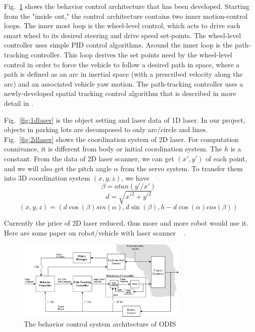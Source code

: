 \documentclass{cdcarta4}
\begin{document}
Fig.~\ref{odis1blk} shows the behavior control architecture that has been developed. 
Starting from the "inside out," the control architecture contains two inner motion-control loops. The inner most loop is the wheel-level control, which acts to drive each smart wheel to its desired steering and drive speed set-points. The wheel-level controller uses simple PID control algorithms. Around the inner loop is the path-tracking controller. This loop derives the set points need by the wheel-level control in order to force the vehicle to follow a desired path in space, where a path is defined as an arc in inertial space (with a prescribed velocity along the arc) and an  associated vehicle yaw motion. The path-tracking controller 
uses a newly-developed spatial tracking control algorithm that is described in more detail in  \cite{odis_icra01}. 


Fig.~\ref{fig:1dlaser} is the object setting and laser data of 1D laser. In our project, 
objects in parking lots are decomposed to only arc/circle and lines. Fig.~\ref{fig:2dlaser}
shows the coordination system of 2D laser. For computation connivance, it is different from 
body or initial coordination system. The $h$ is a constant. From the data of 2D laser scanner, we can get $(x',y')$ of each point, and we will also get the pitch angle $\alpha$ from the servo system. To transfer them into 3D coordination system $(x,y,z)$, we have
$$ \beta=atan(y'/x') $$
$$ d = \sqrt{x'^2 + y'^2} $$
$$ (x,y,z)=(d \cos(\beta)sin(\alpha), d \sin(\beta), h-d \cos(\alpha)cos(\beta) ) $$

Currently the price of 2D laser reduced, thus more and more robot would use it. Here are some paper on robot/vehicle with laser scanner ~\cite{Dedieu00Mixed} \cite{Hartmart2001ISR} \cite{Taylor1996}  \cite{Vandorpe1996} \cite{Cadenat2000} \cite{Laurent1997} \cite{Borenstein96WhereAmI}.

\begin{figure}[!htb]
\center
\includegraphics[width=8.3cm]{img/odis1blk}
\caption{The behavior control system architecture of ODIS} 
\label{odis1blk}
\end{figure} 
\end{document}
